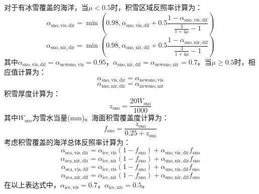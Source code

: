 对于有冰雪覆盖的海洋，当\(\mu < 0.5\)时，积雪区域反照率计算为：
%
\begin{equation}
  \alpha_{\mathrm{sno,vis,dir}} = \min\left( 0.98,\alpha_{\mathrm{sno,vis,dif}} + 0.5\frac{1 - \alpha_{\mathrm{sno,vis,dif}}}{\frac{3}{1 + 4\mu} - 1} \right)
\end{equation}
%
\begin{equation}
  \alpha_{\mathrm{sno,nir,dir}} = \min\left( 0.98,\alpha_{\mathrm{sno,nir,dif}} + 0.5\frac{1 - \alpha_{\mathrm{sno,nir,dif}}}{\frac{3}{1 + 4\mu} - 1} \right)
\end{equation}
%
其中\(\alpha_{\mathrm{sno,vis,dif}} = \alpha_{\mathrm{newsno,vis}} = 0.95\)，\(\alpha_{\mathrm{sno,nir,dif}} = \alpha_{\mathrm{newsno,nir}} = 0.7\)。当\(\mu \geqslant 0.5\)时，相应值计算为：
%
\begin{equation}
  \alpha_{\mathrm{sno,vis,dir}} = \alpha_{\mathrm{newsno,vis}}
\end{equation}
%
\begin{equation}
  \alpha_{\mathrm{sno,nir,dir}} = \alpha_{\mathrm{newsno,nir}}
\end{equation}
%
积雪厚度计算为：
%
\begin{equation}
  z_{\mathrm{sno}} = \frac{20W_{\mathrm{sno}}}{1000}
\end{equation}
%
其中\(W_{\mathrm{sno}}\)为雪水当量(mm)。海面积雪覆盖度计算为：
\begin{equation}
  f_{\mathrm{sno}} = \frac{z_{\mathrm{sno}}}{0.25 + z_{\mathrm{sno}}}
\end{equation}
考虑积雪覆盖的海洋总体反照率计算为：
\begin{equation}
  \alpha_{\mathrm{sea,vis,dir}} = \alpha_{\mathrm{ice,vis}}\left( 1 - f_{\mathrm{sno}} \right) + \alpha_{\mathrm{sno,vis,dir}}f_{\mathrm{sno}}
\end{equation}
%
\begin{equation}
  \alpha_{\mathrm{sea,nir,dir}} = \alpha_{\mathrm{ice,nir}}\left( 1 - f_{\mathrm{sno}} \right) + \alpha_{\mathrm{sno,nir,dir}}f_{\mathrm{sno}}
\end{equation}
%
\begin{equation}
  \alpha_{\mathrm{sea,vis,dif}} = \alpha_{\mathrm{ice,vis}}\left( 1 - f_{\mathrm{sno}} \right) + \alpha_{\mathrm{sno,vis,dif}}f_{\mathrm{sno}}
\end{equation}
%
\begin{equation}
  \alpha_{\mathrm{sea,nir,dif}} = \alpha_{\mathrm{ice,nir}}\left( 1 - f_{\mathrm{sno}} \right) + \alpha_{\mathrm{sno,nir,dif}}f_{\mathrm{sno}}
\end{equation}
在以上表达式中，\(\alpha_{\mathrm{ice,vis}} = 0.7\)，\(\alpha_{\mathrm{ice,nir}} = 0.5\)。

